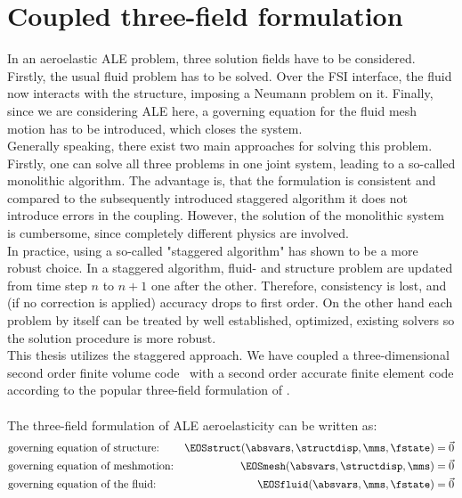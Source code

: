 \documentclass[../main.tex]{subfiles}
\begin{document}
\section{Coupled three-field formulation}\label{sec:3_field_formulation}
In an aeroelastic ALE problem, three solution fields have to be considered. Firstly, the usual fluid problem has to be solved. Over the \ac{FSI} interface, the fluid now interacts with the structure, imposing a Neumann problem on it. Finally, since we are considering \ac{ALE} here, a governing equation for the fluid mesh motion has to be introduced, which closes the system.\\
Generally speaking, there exist two main approaches for solving this problem. Firstly, one can solve all three problems in one joint system, leading to a so-called monolithic algorithm. The advantage is, that the formulation is consistent and compared to the subsequently introduced staggered algorithm it does not introduce errors in the coupling. However, the solution of the monolithic system is cumbersome, since completely different physics are involved.\\
In practice, using a so-called "staggered algorithm" has shown to be a more robust choice. In a staggered algorithm, fluid- and structure problem are updated from time step $n$ to $n+1$ one after the other. Therefore, consistency is lost, and (if no correction is applied) accuracy drops to first order. On the other hand each problem by itself can be treated by well established, optimized, existing solvers so the solution procedure is more robust.\\
This thesis utilizes the staggered approach. We have coupled a three-dimensional second order finite volume code~\cite{Aerof} with a second order accurate finite element code\cite{Aeros} according to the popular three-field formulation of \cite{Farhat1995}.\\
 \\
The three-field formulation of \ac{ALE} aeroelasticity can be written as:
\begin{align}
&\text{governing equation of structure:}  &\EOSstruct (\absvars,\structdisp,\mms,\fstate) = \vec{0} \label{eq:3field_structure}\\
&\text{governing equation of meshmotion:} &\EOSmesh   (\absvars,\structdisp,\mms)         = \vec{0} \label{eq:3field_mesh}\\
&\text{governing equation of the fluid:}  &\EOSfluid  (\absvars,\mms,\fstate)             = \vec{0} \label{eq:3field_fluid}
\end{align}
\end{document}
